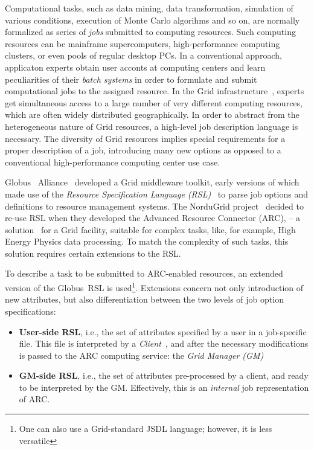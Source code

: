\documentclass{book}
\newcommand{\globus}{Globus\textsuperscript{\textregistered}}
\begin{document}
  Computational tasks, such as data mining, data transformation, simulation of various conditions, execution of Monte Carlo algorihms and so on, are normally formalized as series of \textit{jobs} submitted to computing resources. Such computing resources can be mainframe supercomputers, high-performance computing clusters, or even pools of regular desktop PCs. In a conventional approach, applicaton experts obtain user acconts at computing centers and learn peculiarities of their \textit{batch systems} in order to formulate and submit computational jobs to the assigned resource.
  In the Grid infrastructure~\cite{grid}, experts get simultaneous access to a large number of very different computing resources, which are often widely distributed geographically. In order to abstract from the heterogeneous nature of Grid resources, a high-level job description language is necessary. The diversity of Grid resources implies special requirements for a
  proper description of a job, introducing many new options as opposed to a conventional high-performance computing center use case.

  Globus\ 
  Alliance~\cite{globus} developed a Grid middleware toolkit, early versions of which
  made use of the \textit{Resource Specification Language
  (RSL)}~\cite{rsl} to parse job options and definitions to
  resource management systems. The NorduGrid project~\cite{nordugrid}
   decided to re-use RSL when they developed the Advanced Resource Connector (ARC),
  -- a
  solution~\cite{arc} for a Grid facility, suitable for
  complex tasks, like, for example, High Energy Physics
  data processing. To match the complexity of such tasks, this solution
  requires certain extensions to the RSL.

  To describe a task to be submitted to ARC-enabled resources, an
  extended version of the \globus\  RSL is used\footnote{One can also use a Grid-standard JSDL language; however, it is less versatile}. Extensions concern
  not only introduction of new attributes, but also differentiation
  between the two levels of job option specifications:

  \begin{itemize}
  \item[] \textbf{User-side RSL}, i.e., the set of attributes
    specified by a user in a job-specific file. This file is
    interpreted by a \textit{Client}~\cite{ui},
     and after the necessary modifications is
    passed to the ARC computing service: the \textit{Grid Manager (GM)}~\cite{gm}
  \item[] \textbf{GM-side RSL}, i.e., the set of attributes
    pre-processed by a client, and ready to be interpreted by the GM. Effectively, this is an \textit{internal} job representation of ARC.
  \end{itemize}
\end{document}

